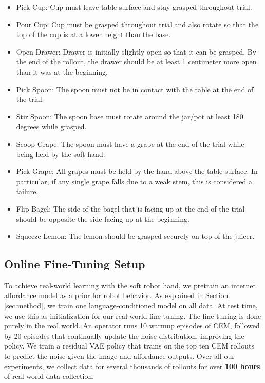 \begin{itemize}
    \item Pick Cup: Cup must leave table surface and stay grasped throughout trial.
    \item Pour Cup: Cup must be grasped throughout trial and also rotate so that the top of the cup is at a lower height than the base.
    \item Open Drawer: Drawer is initially slightly open so that it can be grasped. By the end of the rollout, the drawer should be at least 1 centimeter more open than it was at the beginning.
    \item Pick Spoon: The spoon must not be in contact with the table at the end of the trial.
    \item Stir Spoon: The spoon base must rotate around the jar/pot at least 180 degrees while grasped.
    \item Scoop Grape: The spoon must have a grape at the end of the trial while being held by the soft hand.
    \item Pick Grape: All grapes must be held by the hand above the table surface. In particular, if any single grape falls due to a weak stem, this is considered a failure.
    \item Flip Bagel: The side of the bagel that is facing up at the end of the trial should be opposite the side facing up at the beginning.
    \item Squeeze Lemon: The lemon should be grasped securely on top of the juicer.
\end{itemize}

\subsection{Online Fine-Tuning Setup}

To achieve real-world learning with the soft robot hand, we pretrain an internet affordance model as a prior for robot behavior.  As explained in Section \ref{sec:method}, we train one language-conditioned model on all data.  At test time, we use this as initialization for our real-world fine-tuning. The fine-tuning is done purely in the real world.  An operator runs 10 warmup episodes of CEM, followed by 20 episodes that continually update the noise distribution, improving the policy. We train a residual VAE policy that trains on the top ten CEM rollouts to predict the noise given the image and affordance outputs. Over all our experiments, we collect data for several thousands of rollouts for over \textbf{100 hours} of real world data collection.

